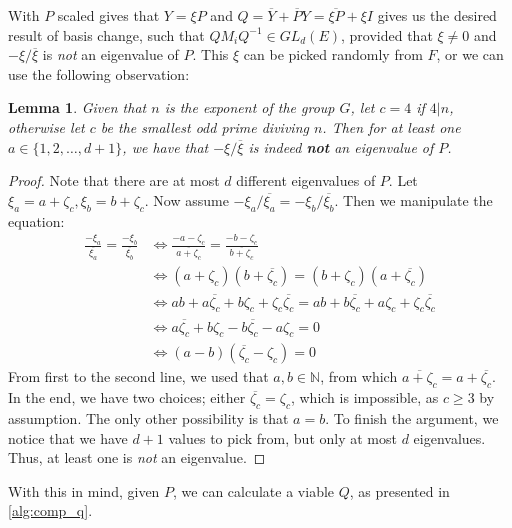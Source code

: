 \documentclass[11pt]{article}
\newtheorem{lemma}[theorem]{Lemma}
\begin{document}
With $P$ scaled \cite[Lemma 3.3]{Pas21} gives that $Y = \xi P$ and $Q = \overline{Y} + \overline{P}Y = \overline{\xi P} + \xi I$
gives us the desired result of basis change, such that $QM_iQ^{-1} \in GL_d(E)$, provided
that $\xi \neq 0$ and $-\xi/\overline{\xi}$ is \textit{not} an eigenvalue of $P$.
This $\xi$ can be picked randomly from $F$, or we can use the following observation:
\begin{lemma}\label{lem:derandomising}
  Given that $n$ is the exponent of the group $G$, let $c = 4$ if $4|n$, otherwise let $c$ be
  the smallest odd prime diviving $n$. Then for at least one $a \in \{1,2,\ldots,d+1\}$, we have
  that $-\xi/\overline{\xi}$ is indeed \textbf{not} an eigenvalue of $P$.
\end{lemma}
\begin{proof}
  Note that there are at most $d$ different eigenvalues of $P$. Let $\xi_a = a + \zeta_c, \xi_b = b + \zeta_c$.
  Now assume $-\xi_a/\overline{\xi_a} = -\xi_b/\overline{\xi_b}$. Then we manipulate the equation:
  \begin{align*}
    \frac{-\xi_a}{\overline{\xi_a}} = \frac{-\xi_b}{\overline{\xi_b}}
    & \Leftrightarrow \frac{-a - \zeta_c}{\overline{a + \zeta_c}} = \frac{-b - \zeta_c}{\overline{b + \zeta_c}} \\
    & \Leftrightarrow (a + \zeta_c)(b + \overline{\zeta_c}) = (b + \zeta_c)(a + \overline{\zeta_c}) \\
    & \Leftrightarrow ab + a\overline{\zeta_c}+b\zeta_c + \zeta_c\overline{\zeta_c} = ab + b\overline{\zeta_c}+a\zeta_c + \zeta_c\overline{\zeta_c} \\
    & \Leftrightarrow a\overline{\zeta_c} + b\zeta_c - b\overline{\zeta_c} - a\zeta_c = 0 \\
    & \Leftrightarrow (a - b)(\overline{\zeta_c} - \zeta_c) = 0
  \end{align*}
  From first to the second line, we used that $a,b\in\mathbb{N}$, from which $\overline{a + \zeta_c} = a + \overline{\zeta_c}$.
  In the end, we have two choices; either $\overline{\zeta_c} = \zeta_c$, which is impossible, as $c \geq 3$ by assumption.
  The only other possibility is that $a=b$. To finish the argument, we notice that we have $d+1$ values to pick from,
  but only at most $d$ eigenvalues. Thus, at least one is \textit{not} an eigenvalue.
\end{proof}
With this in mind, given $P$, we can calculate a viable $Q$, as presented in \cref{alg:comp_q}.
\end{document}
